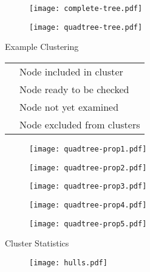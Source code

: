 \documentclass{beamer}
\begin{document}
\begin{frame}
	\begin{figure}
		\texttt{[image: complete-tree.pdf]}
	\end{figure}
\end{frame}

\begin{frame}
	\begin{figure}
		\texttt{[image: quadtree-tree.pdf]}
	\end{figure}
\end{frame}

\begin{frame}{Example Clustering}
	\begin{table}
		\begin{tabular}{l l}
			\cellcolor{lred}   & Node included in cluster \\
			\cellcolor{lblue}  & Node ready to be checked \\
			\phantom{one}      & Node not yet examined \\
			\cellcolor{silver} & Node excluded from clusters \\
		\end{tabular}
	\end{table}
\end{frame}

\begin{frame}
	\begin{figure}
		\texttt{[image: quadtree-prop1.pdf]}
	\end{figure}
\end{frame}

\begin{frame}
	\begin{figure}
		\texttt{[image: quadtree-prop2.pdf]}
	\end{figure}
\end{frame}

\begin{frame}
	\begin{figure}
		\texttt{[image: quadtree-prop3.pdf]}
	\end{figure}
\end{frame}

\begin{frame}
	\begin{figure}
		\texttt{[image: quadtree-prop4.pdf]}
	\end{figure}
\end{frame}

\begin{frame}
	\begin{figure}
		\texttt{[image: quadtree-prop5.pdf]}
	\end{figure}
\end{frame}

\begin{frame}
\end{frame}

\begin{frame}{Cluster Statistics}
	\begin{figure}
		\texttt{[image: hulls.pdf]}
	\end{figure}
\end{frame}

\begin{frame}
\end{frame}
\end{document}
